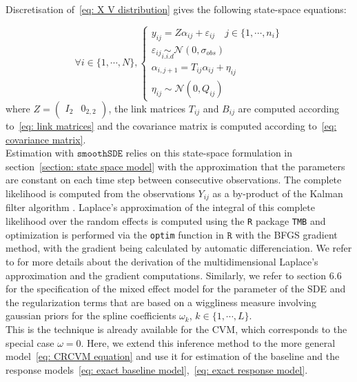 \documentclass[11pt]{article}
\newcommand {\1}{\mathbb{1}}
\theoremstyle{definition}
\theoremstyle{remark}
\theoremstyle{remark}
\begin{document}
Discretisation of~\ref{eq: X V distribution} gives the following state-space equations:

\begin{equation}
	\forall i \in \{1,\cdots,N\}, \left\{
	\begin{array}{l}
		y_{ij}=Z\alpha_{ij}+\varepsilon_{ij} \quad j \in \{1,\cdots,n_i\}\\
		\varepsilon_{ij} \underset{i.i.d}{\sim} \mathcal{N}(0,\sigma_{obs}) \\
		\alpha_{i,j+1}=T_{ij} \alpha_{ij} + \eta_{ij} \\
		\eta_{ij} \sim \mathcal{N}(0,Q_{ij})
	\end{array}
	\right.
	\label{eq: RACVM state space}
\end{equation}
where $Z=\begin{pmatrix} I_2 & 0_{2,2}\end{pmatrix}$, the link matrices $T_{ij}$ and $B_{ij}$ are computed according to~\ref{eq: link matrices} and the covariance matrix is computed according to~\ref{eq: covariance matrix}.
\\

Estimation with $\texttt{smoothSDE}$ relies on this state-space formulation in section~\ref{section: state space model} with the approximation that the parameters are constant on each time step between consecutive observations.
The complete likelihood is computed from the observations $Y_{ij}$ as a by-product of the Kalman filter algorithm \cite{michelot_varying-coefficient_2021}.
Laplace's approximation of the integral of this complete likelihood over the random effects is computed using the \texttt{R} package \texttt{TMB}  and optimization is performed via the \texttt{optim} function in $\texttt{R}$ with the BFGS gradient method, with the gradient being calculated by automatic differenciation. We refer to \cite{kristensen_tmb_2016} for more details about the derivation of the multidimensional Laplace's approximation and the gradient computations. Similarly, we refer to \cite{wood_generalized_2017} section $6.6$ for the specification of the mixed effect model for the parameter of the SDE and the regularization terms that are based on a wiggliness measure involving gaussian priors for the spline coefficients $\omega_k$, $k \in \{1,\cdots,L\}$. \\
This is the technique is already available for the CVM, which corresponds to the special case $\omega=0$. Here, we extend this inference method to the more general model~\ref{eq: CRCVM equation} and use it for estimation of the baseline and the response models~\ref{eq: exact baseline model},~\ref{eq: exact response model}.
\end{document}
